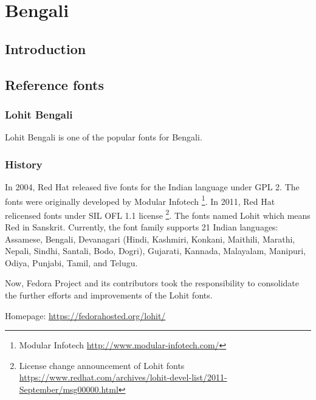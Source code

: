 \chapter{Bengali}
\section{Introduction}

\section{Reference fonts}

\subsection{Lohit Bengali}

Lohit Bengali is one of the popular fonts for Bengali.

\subsection{History}
In 2004, Red Hat released five fonts for the Indian language under GPL 2.
The fonts were originally developed by Modular Infotech
\footnote{Modular Infotech \url{http://www.modular-infotech.com/}}.
In 2011, Red Hat relicensed fonts under SIL OFL 1.1 license
\footnote{License change announcement of Lohit fonts
\url{https://www.redhat.com/archives/lohit-devel-list/2011-September/msg00000.html}}.
The fonts named Lohit which means Red in Sanskrit. Currently, the font family
supports 21 Indian languages: Assamese, Bengali, Devanagari (Hindi, Kashmiri,
Konkani, Maithili, Marathi, Nepali, Sindhi, Santali, Bodo, Dogri), Gujarati,
Kannada, Malayalam, Manipuri, Odiya, Punjabi, Tamil, and Telugu.

Now, Fedora Project and its contributors took the responsibility to consolidate
the further efforts and improvements of the Lohit fonts.

Homepage: {\url{https://fedorahosted.org/lohit/}}
